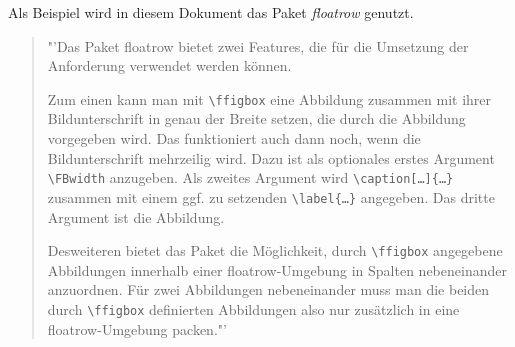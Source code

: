 Als Beispiel wird in diesem Dokument das Paket \emph{floatrow} genutzt.
\begin{quote}
	"'Das Paket floatrow bietet zwei Features, die für die Umsetzung der Anforderung verwendet werden können.
	
	Zum einen kann man mit \verb|\ffigbox| eine Abbildung zusammen mit ihrer Bildunterschrift in genau der Breite setzen, die durch die Abbildung vorgegeben wird. Das funktioniert auch dann noch, wenn die Bildunterschrift mehrzeilig wird. Dazu ist als optionales erstes Argument \verb|\FBwidth| anzugeben. Als zweites Argument wird \verb|\caption[…]{…}| zusammen mit einem ggf. zu setzenden \verb|\label{…}| angegeben. Das dritte Argument ist die Abbildung.
	
	Desweiteren bietet das Paket die Möglichkeit, durch \verb|\ffigbox| angegebene Abbildungen innerhalb einer floatrow-Umgebung in Spalten nebeneinander anzuordnen. Für zwei Abbildungen nebeneinander muss man die beiden durch \verb|\ffigbox| definierten Abbildungen also nur zusätzlich in eine floatrow-Umgebung packen."'\autocite{floatrow}
\end{quote}
\begin{figure}[h]
	\centering
	\begin{floatrow}
	\end{floatrow}
\end{figure}

